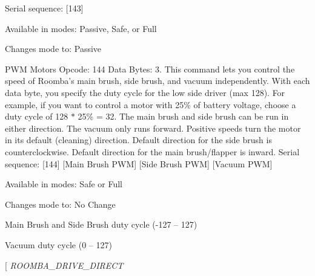 \begin{Desc}
\begin{description}
\begin{DoxyItemize}
\item Serial sequence\+: \mbox{[}143\mbox{]}
\item Available in modes\+: Passive, Safe, or Full
\item Changes mode to\+: Passive 
\end{DoxyItemize}\item[{\em 
\hypertarget{group__roomba-lib_gga305e17dfb7050ad83ea49ded2e6a2e24ab1891f6f7f69dc7936ca25751b7dfd8f}{}R\+O\+O\+M\+B\+A\+\_\+\+P\+W\+M\+\_\+\+M\+O\+T\+O\+R\+S\label{group__roomba-lib_gga305e17dfb7050ad83ea49ded2e6a2e24ab1891f6f7f69dc7936ca25751b7dfd8f}
}]P\+W\+M Motors Opcode\+: 144 Data Bytes\+: 3. This command lets you control the speed of Roomba’s main brush, side brush, and vacuum independently. With each data byte, you specify the duty cycle for the low side driver (max 128). For example, if you want to control a motor with 25\% of battery voltage, choose a duty cycle of 128 $\ast$ 25\% = 32. The main brush and side brush can be run in either direction. The vacuum only runs forward. Positive speeds turn the motor in its default (cleaning) direction. Default direction for the side brush is counterclockwise. Default direction for the main brush/flapper is inward. Serial sequence\+: \mbox{[}144\mbox{]} \mbox{[}Main Brush P\+W\+M\mbox{]} \mbox{[}Side Brush P\+W\+M\mbox{]} \mbox{[}Vacuum P\+W\+M\mbox{]}
\begin{DoxyItemize}
\item Available in modes\+: Safe or Full
\item Changes mode to\+: No Change
\item Main Brush and Side Brush duty cycle (-\/127 – 127)
\item Vacuum duty cycle (0 – 127) 
\end{DoxyItemize}\item[{\em 
\hypertarget{group__roomba-lib_gga305e17dfb7050ad83ea49ded2e6a2e24a16a8f754217439e90a92a47d5e19c605}{}R\+O\+O\+M\+B\+A\+\_\+\+D\+R\+I\+V\+E\+\_\+\+D\+I\+R\+E\+C\+T\label{group__roomba-lib_gga305e17dfb7050ad83ea49ded2e6a2e24a16a8f754217439e90a92a47d5e19c605}
}
\end{description}
\end{Desc}
